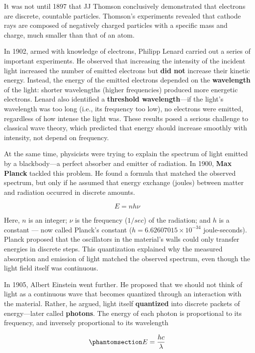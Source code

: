 \documentclass[
  letterpaper,
]{book}
\begin{document}
It was not until 1897 that JJ Thomson conclusively demonstrated that
electrons are discrete, countable particles. Thomson's experiments
revealed that cathode rays are composed of negatively charged particles
with a specific mass and charge, much smaller than that of an atom.

In 1902, armed with knowledge of electrons, Philipp Lenard carried out a
series of important experiments. He observed that increasing the
intensity of the incident light increased the number of emitted
electrons but \textbf{did not} increase their kinetic energy. Instead,
the energy of the emitted electrons depended on the \textbf{wavelength}
of the light: shorter wavelengths (higher frequencies) produced more
energetic electrons. Lenard also identified a \textbf{threshold
wavelength}---if the light's wavelength was too long (i.e., its
frequency too low), no electrons were emitted, regardless of how intense
the light was. These results posed a serious challenge to classical wave
theory, which predicted that energy should increase smoothly with
intensity, not depend on frequency.

At the same time, physicists were trying to explain the spectrum of
light emitted by a blackbody---a perfect absorber and emitter of
radiation. In 1900, \textbf{Max Planck} tackled this problem. He found a
formula that matched the observed spectrum, but only if he assumed that
energy exchange (joules) between matter and radiation occurred in
discrete amounts.

\[
E = n h \nu
\]

Here, \(n\) is an integer; \(\nu\) is the frequency (\(1/sec\)) of the
radiation; and \(h\) is a constant --- now called Planck's constant
(\(h = 6.62607015 \times 10^{-34}\) joule-seconds). Planck proposed that
the oscillators in the material's walls could only transfer energies in
discrete steps. This quantization explained why the measured absorption
and emission of light matched the observed spectrum, even though the
light field itself was continuous.

In 1905, Albert Einstein went further. He proposed that we should not
think of light as a continuous wave that becomes quantized through an
interaction with the material. Rather, he argued, light itself
\textbf{quantized} into discrete packets of energy---later called
\textbf{photons}. The energy of each photon is proportional to its
frequency, and inversely proportional to its wavelength

\begin{equation}\phantomsection\label{eq-plancks-formula}{
E = \frac{h c}{\lambda} 
}\end{equation}
\end{document}
